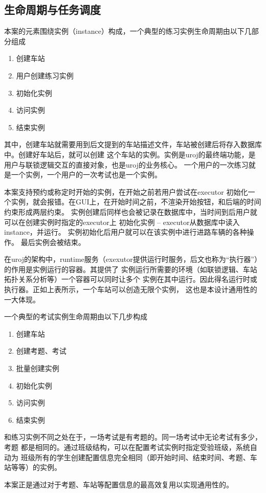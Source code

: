 \subsection{生命周期与任务调度}
本案的元素围绕实例（instance）构成，一个典型的练习实例生命周期由以下几部分组成
\begin{enumerate}[\indent i.]
    \item 创建车站
    \item 用户创建练习实例
    \item 初始化实例
    \item 访问实例
    \item 结束实例
\end{enumerate}

其中，创建车站就需要用到后文提到的车站描述文件，车站被创建后将存入数据库中。创建好车站后，就可以创建
这个车站的实例。实例是uroj的最终端功能，是用户与联锁逻辑交互的直接对象，也是uroj的业务核心。
一个用户的一次练习就是一个实例，一个用户的一次考试也是一个实例。

本案支持预约或称定时开始的实例，在开始之前若用户尝试在executor
初始化一个实例，就会报错。在GUI上，在开始时间之前，不渲染开始按钮，和后端的时间约束形成两层约束。
实例创建后同样也会被记录在数据库中，当时间到后用户就可以在创建实例时指定的executor上
初始化实例 -- executor从数据库中读入instance，并运行。
实例初始化后用户就可以在该实例中进行进路车辆的各种操作。
最后实例会被结束。

在uroj的架构中，runtime服务（exexutor提供运行时服务，后文也称为“执行器”）的作用是实例运行的容器。其提供了
实例运行所需要的环境（如联锁逻辑、车站拓扑关系分析等）一个容器可以同时让多个
实例在其中运行。因此得名运行时或执行器。正如上表所示，一个车站可以创造无限个实例，
这也是本设计通用性的一大体现。

一个典型的考试实例生命周期由以下几步构成
\begin{enumerate}[\indent i.]
    \item 创建车站
    \item 创建考题、考试
    \item 批量创建实例
    \item 初始化实例
    \item 访问实例
    \item 结束实例
\end{enumerate}

和练习实例不同之处在于，一场考试是有考题的。同一场考试中无论考试有多少，考题
都是相同的。通过班级结构，可以在配置考试实例时指定受验班级，系统自动为
班级所有的学生创建配置信息完全相同（即开始时间、结束时间、考题、车站等等）的实例。

本案正是通过对于考题、车站等配置信息的最高效复用以实现通用性的。